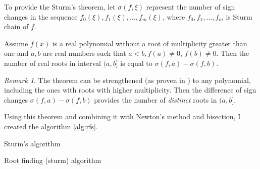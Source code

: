 \documentclass[
  digital, %
  notable,   %
  nolof,     %
  nolot,     %
	draft, %
]{fithesis3}
\begin{document}
To provide the Sturm's theorem, let $\sigma(f,\xi)$ represent the number of sign changes in the sequence $f_{0}(\xi), f_{1}(\xi),\ldots,f_{m}(\xi)$, where $f_{0}, f_{1},\ldots,f_{m}$ is Sturm chain of $f$.

\begin{theorem}
Assume $f(x)$ is a real polynomial without a root of multiplicity greater than one and $a, b$ are real numbers such that $a<b, f(a)\neq{0}$, $f(b)\neq{0}$. Then the number of real roots in interval $(a,b]$ is equal to $\sigma(f,a) - \sigma(f,b)$.
\end{theorem}
\theoremstyle{remark}
\newtheorem*{remark}{Remark}
\begin{remark}
  The theorem can be strengthened (as proven in \cite{sturmGeneral}) to any polynomial, including the ones with roots with higher multiplicity. Then the difference of sign changes $\sigma(f,a) - \sigma(f,b)$ provides the number of \textit{distinct} roots in $(a,b]$.
\end{remark}
Using this theorem and combining it with Newton's method and bisection, I created the algorithm \ref{alg:rfs}.
\begin{algorithm}
  \caption{Sturm's algorithm
    \label{alg:sturm}}
  \begin{algorithmic}[1]
    \Statex
			\EndIf
			\EndIf
			\EndIf
			\EndIf
		\EndWhile
		\State{}
    \EndFunction
  \end{algorithmic}
\end{algorithm}
\begin{algorithm}
  \caption{Root finding (sturm) algorithm
    \label{alg:rfs}}
  \begin{algorithmic}[1]
    \Statex
						\State{}
					\EndIf
				\EndIf
			\EndIf
    \EndFunction
  \end{algorithmic}
\end{algorithm}
\end{document}

